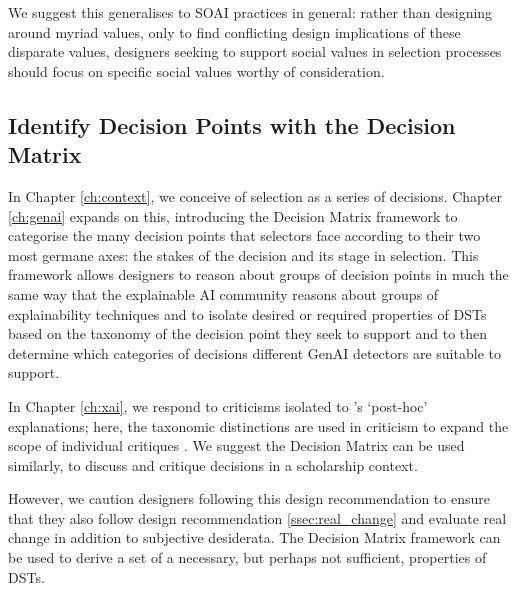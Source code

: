 We suggest this generalises to SOAI practices in general: rather than designing around myriad values, only to find conflicting design implications of these disparate values, designers seeking to support social values in selection processes should focus on specific social values worthy of consideration.

\subsection{Identify Decision Points with the Decision Matrix}
In Chapter \ref{ch:context}, we conceive of selection as a series of decisions. Chapter \ref{ch:genai} expands on this, introducing the Decision Matrix framework to categorise the many decision points that selectors face according to their two most germane axes: the stakes of the decision and its stage in selection. This framework allows designers to reason about groups of decision points in much the same way that the explainable AI community reasons about groups of explainability techniques and to isolate desired or required properties of DSTs based on the taxonomy of the decision point they seek to support and to then determine which categories of decisions different GenAI detectors are suitable to support\cite{ford_play_2020,kumar_problems_2020,doshi-velez_towards_2017,friedrich_taxonomy_2011,molnar_interpretable_2019}. 

In Chapter \ref{ch:xai}, we respond to criticisms isolated to \textcite{friedrich_taxonomy_2011}'s `post-hoc' explanations; here, the taxonomic distinctions are used in criticism to expand the scope of individual critiques \cite{barocas_hidden_2020,kumar_problems_2020}. We suggest the Decision Matrix can be used similarly, to discuss and critique decisions in a scholarship context.

However, we caution designers following this design recommendation to ensure that they also follow design recommendation \ref{ssec:real_change} and evaluate real change in addition to subjective desiderata. The Decision Matrix framework can be used to derive a set of a necessary, but perhaps not sufficient, properties of DSTs.

